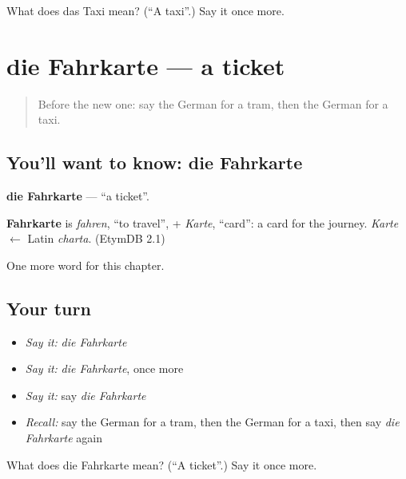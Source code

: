 \begin{tcolorbox}[breakable,colback=teal!4,colframe=teal!35!black,title={Before you move on}]
What does das Taxi mean? (\textquotedblleft{}A taxi\textquotedblright{}.) Say it once more.
\end{tcolorbox}
\section[die Fahrkarte]{die Fahrkarte — a ticket}

\label{lesson:GE-C111-fahrkarte}



\begin{quote}
Before the new one: say the German for a tram, then the German for a taxi.
\end{quote}

\subsection*{You'll want to know: die Fahrkarte}
\textbf{die Fahrkarte} — \textquotedblleft{}a ticket\textquotedblright{}.

\begin{cousinweb}
\textbf{Fahrkarte} is \emph{fahren}, \textquotedblleft{}to travel\textquotedblright{}, + \emph{Karte}, \textquotedblleft{}card\textquotedblright{}: a card for the journey. \emph{Karte} $\leftarrow$ Latin \emph{charta}. (EtymDB 2.1)
\end{cousinweb}

\begin{grammarlens}[title={What you've built}]
One more word for this chapter.
\end{grammarlens}

\subsection*{Your turn}
\begin{itemize}
\raggedright
  \item \emph{Say it:} \emph{die Fahrkarte}
  \item \emph{Say it:} \emph{die Fahrkarte}, once more
  \item \emph{Say it:} say \emph{die Fahrkarte}
  \item \emph{Recall:} say the German for a tram, then the German for a taxi, then say \emph{die Fahrkarte} again
\end{itemize}

\begin{tcolorbox}[breakable,colback=teal!4,colframe=teal!35!black,title={Before you move on}]
What does die Fahrkarte mean? (\textquotedblleft{}A ticket\textquotedblright{}.) Say it once more.
\end{tcolorbox}
